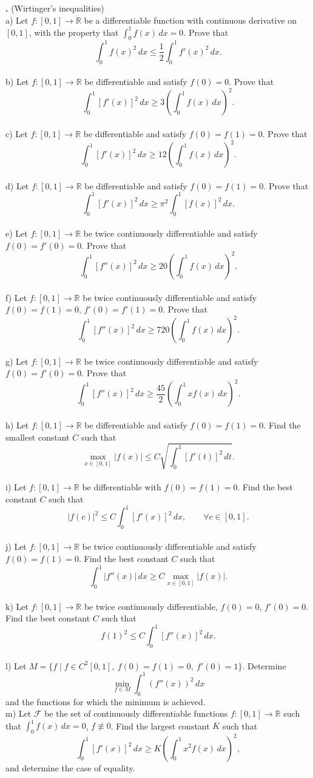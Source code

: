 \documentclass[12pt]{article}
\newcounter{raprob}
\newcommand{\raproblem}[1]{%
  \stepcounter{raprob}%
  \begin{problem}
  \textbf{\theraprob.} #1
  \end{problem}
}
\begin{document}
\raproblem{(Wirtinger's inequalities)
\\
a) Let $f : [0,1] \to \mathbb{R}$ be a differentiable function with continuous derivative on $[0,1]$, with the property that $\displaystyle\int_0^1 f(x)\,dx = 0$. Prove that
\[
\int_0^1 f(x)^2\,dx \le \frac{1}{2} \int_0^1 f'(x)^2\,dx.
\]
\\
b) Let $f : [0,1] \to \mathbb{R}$ be differentiable and satisfy $f(0)=0$. Prove that
\[
\int_0^1 [f'(x)]^2\,dx \ge 3 \left(\int_0^1 f(x)\,dx\right)^2.
\]
\\
c) Let $f : [0,1] \to \mathbb{R}$ be differentiable and satisfy $f(0)=f(1)=0$. Prove that
\[
\int_0^1 [f'(x)]^2\,dx \ge 12 \left(\int_0^1 f(x)\,dx\right)^2.
\]
\\
d) Let $f : [0,1] \to \mathbb{R}$ be differentiable and satisfy $f(0)=f(1)=0$. Prove that
\[
\int_0^1 [f'(x)]^2\,dx \ge \pi^2 \int_0^1 [f(x)]^2\,dx.
\]
\\
e) Let $f : [0,1] \to \mathbb{R}$ be twice continuously differentiable and satisfy $f(0)=f'(0)=0$. Prove that
\[
\int_0^1 [f''(x)]^2\,dx \ge 20 \left(\int_0^1 f(x)\,dx\right)^2.
\]
\\
f) Let $f : [0,1] \to \mathbb{R}$ be twice continuously differentiable and satisfy $f(0)=f(1)=0$, $f'(0)=f'(1)=0$. Prove that
\[
\int_0^1 [f''(x)]^2\,dx \ge 720 \left(\int_0^1 f(x)\,dx\right)^2.
\]
\\
g) Let $f : [0,1] \to \mathbb{R}$ be twice continuously differentiable and satisfy $f(0)=f'(0)=0$. Prove that
\[
\int_0^1 [f''(x)]^2\,dx \ge \frac{45}{2} \left(\int_0^1 x f(x)\,dx\right)^2.
\]
\\
h) Let $f : [0,1] \to \mathbb{R}$ be differentiable and satisfy $f(0)=f(1)=0$. Find the smallest constant $C$ such that
\[
\max_{x \in [0,1]} |f(x)| \le C \sqrt{\int_0^1 [f'(t)]^2\,dt}.
\]
\\
i) Let $f : [0,1] \to \mathbb{R}$ be differentiable with $f(0)=f(1)=0$. Find the best constant $C$ such that
\[
|f(c)|^2 \le C \int_0^1 [f'(x)]^2\,dx, \qquad \forall c \in [0,1].
\]
\\
j) Let $f : [0,1] \to \mathbb{R}$ be twice continuously differentiable and satisfy $f(0)=f(1)=0$. Find the best constant $C$ such that
\[
\int_0^1 |f''(x)|\,dx \ge C \max_{x \in [0,1]} |f(x)|.
\]
\\
k) Let $f : [0,1] \to \mathbb{R}$ be twice continuously differentiable, $f(0)=0$, $f'(0)=0$. Find the best constant $C$ such that
\[
f(1)^2 \le C \int_0^1 [f''(x)]^2\,dx.
\]
\\
l) Let $M = \{f \mid f \in C^2[0,1],\ f(0)=f(1)=0,\ f'(0)=1\}$. Determine
\[
\min_{f \in M} \int_0^1 (f''(x))^2\,dx
\]
and the functions for which the minimum is achieved.\\
m) Let $\mathcal{F}$ be the set of continuously differentiable functions $f : [0,1] \to \mathbb{R}$ such that $\displaystyle\int_0^1 f(x)\,dx = 0$, $f \not\equiv 0$. Find the largest constant $K$ such that
\[
\int_0^1 [f'(x)]^2\,dx \ge K \left(\int_0^1 x^2 f(x)\,dx\right)^2,
\]
and determine the case of equality.}
\end{document}
